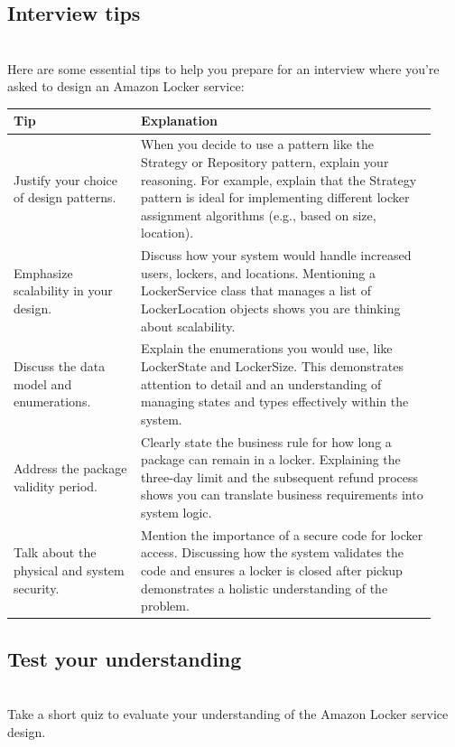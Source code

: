 \subsection{Interview tips}\label{ALREkLA_dSnTEJUdFt2sP}
\\
Here are some essential tips to help you prepare for an interview where you're asked to design an Amazon Locker service:

\begin{center}
\begin{tabular}{|p{0.28\linewidth}|p{0.65\linewidth}|}
\hline
\textbf{Tip} & \textbf{Explanation} \\
\hline
Justify your choice of design patterns. & When you decide to use a pattern like the Strategy or Repository pattern, explain your reasoning. For example, explain that the Strategy pattern is ideal for implementing different locker assignment algorithms (e.g., based on size, location). \\
\hline
Emphasize scalability in your design. & Discuss how your system would handle increased users, lockers, and locations. Mentioning a LockerService class that manages a list of LockerLocation objects shows you are thinking about scalability. \\
\hline
Discuss the data model and enumerations. & Explain the enumerations you would use, like LockerState and LockerSize. This demonstrates attention to detail and an understanding of managing states and types effectively within the system. \\
\hline
Address the package validity period. & Clearly state the business rule for how long a package can remain in a locker. Explaining the three-day limit and the subsequent refund process shows you can translate business requirements into system logic. \\
\hline
Talk about the physical and system security. & Mention the importance of a secure code for locker access. Discussing how the system validates the code and ensures a locker is closed after pickup demonstrates a holistic understanding of the problem. \\
\hline
\end{tabular}
\end{center}


\subsection{Test your understanding}\label{wtW-QTVjZ9NkokC9nhgxL}
\\
Take a short quiz to evaluate your understanding of the Amazon Locker service design.

